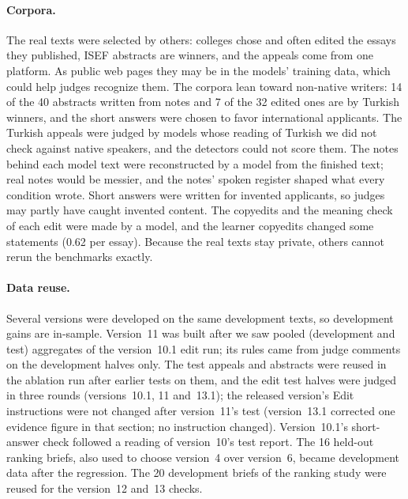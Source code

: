 \documentclass[11pt]{article}
\newcommand{\shipver}{13.1}
\begin{document}
\paragraph{Corpora.} The real texts were selected by others: colleges chose and often edited the essays they published, ISEF abstracts are winners, and the appeals come from one platform. As public web pages they may be in the models' training data, which could help judges recognize them. The corpora lean toward non-native writers: 14 of the 40 abstracts written from notes and 7 of the 32 edited ones are by Turkish winners, and the short answers were chosen to favor international applicants. The Turkish appeals were judged by models whose reading of Turkish we did not check against native speakers, and the detectors could not score them. The notes behind each model text were reconstructed by a model from the finished text; real notes would be messier, and the notes' spoken register shaped what every condition wrote. Short answers were written for invented applicants, so judges may partly have caught invented content. The copyedits and the meaning check of each edit were made by a model, and the learner copyedits changed some statements (0.62 per essay). Because the real texts stay private, others cannot rerun the benchmarks exactly.

\paragraph{Data reuse.} Several versions were developed on the same development texts, so development gains are in-sample. Version~11 was built after we saw pooled (development and test) aggregates of the version~10.1 edit run; its rules came from judge comments on the development halves only. The test appeals and abstracts were reused in the ablation run after earlier tests on them, and the edit test halves were judged in three rounds (versions~10.1, 11 and~\shipver{}); the released version's Edit instructions were not changed after version~11's test (version~\shipver{} corrected one evidence figure in that section; no instruction changed). Version~10.1's short-answer check followed a reading of version~10's test report. The 16 held-out ranking briefs, also used to choose version~4 over version~6, became development data after the regression. The 20 development briefs of the ranking study were reused for the version~12 and~13 checks.
\end{document}
